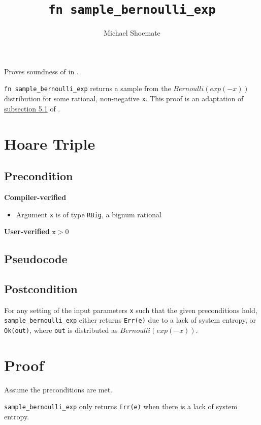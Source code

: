 \documentclass{article}
\title{\texttt{fn sample\_bernoulli\_exp}}
\author{Michael Shoemate}
\begin{document}
 
\maketitle 
 
Proves soundness of  in . 
 
\texttt{fn sample\_bernoulli\_exp} returns a sample from the $Bernoulli(exp(-x))$ distribution for some rational, non-negative \texttt{x}. 
This proof is an adaptation of \href{https://arxiv.org/pdf/2004.00010.pdf#subsection.5.1}{subsection 5.1} of \cite{CKS20}. 
 
\section{Hoare Triple} 
\subsection*{Precondition} 
\textbf{Compiler-verified} 
\begin{itemize} 
    \item Argument \texttt{x} is of type \texttt{RBig}, a bignum rational 
\end{itemize} 
 
\textbf{User-verified} 
$\texttt{x} > 0$ 
 
\subsection*{Pseudocode}         
 
 
\subsection*{Postcondition} 
\label{postcondition} 
For any setting of the input parameters \texttt{x} such that the given preconditions hold, \\ 
\texttt{sample\_bernoulli\_exp} either returns \texttt{Err(e)} due to a lack of system entropy, 
or \texttt{Ok(out)}, where \texttt{out} is distributed as $Bernoulli(exp(-x))$. 
 
\section{Proof} 
Assume the preconditions are met. 
 
\begin{lemma} 
    \label{err-e} 
    \texttt{sample\_bernoulli\_exp} only returns \texttt{Err(e)} when there is a lack of system entropy. 
\end{lemma} 
 
\end{document}
